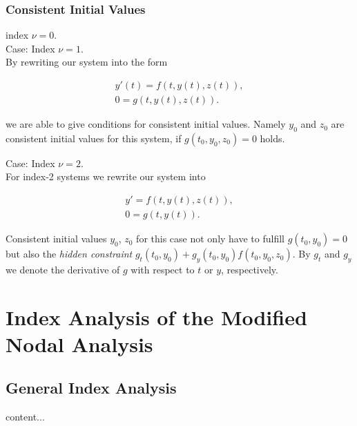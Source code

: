 	\subsubsection{Consistent Initial Values}
	\begin{frame}
		index $\nu = 0$.\\ 
		
		Case: Index $\nu = 1$.\\
		
			By rewriting our system into the form
			
			\begin{align*}
				y'(t) = f(t,y(t),z(t)), \\
				0 = g(t,y(t),z(t)).
			\end{align*}
			
			we are able to give conditions for consistent initial values. Namely $y_0$ and $z_0$ are consistent initial values for this system, if $g(t_0, y_0, z_0) = 0$ holds.
			
	\end{frame}

	\begin{frame}
		Case: Index $\nu = 2$.\\
		
		For index-2 systems we rewrite our system into
		
		\begin{align*}
			y' = f(t,y(t),z(t)), \\
			0 = g(t,y(t)).
		\end{align*}
		
		Consistent initial values $y_0$, $z_0$ for this case not only have to fulfill $g(t_0, y_0) = 0$ but also the \emph{hidden constraint} $g_t(t_0, y_0) + g_y(t_0, y_0)f(t_0, y_0, z_0)$. By $g_t$ and $g_y$ we denote the derivative of $g$ with respect to $t$ or $y$, respectively.
	\end{frame}

\section{Index Analysis of the Modified Nodal Analysis}
	\subsection{General Index Analysis}
	\begin{frame}
		content...
	\end{frame}
